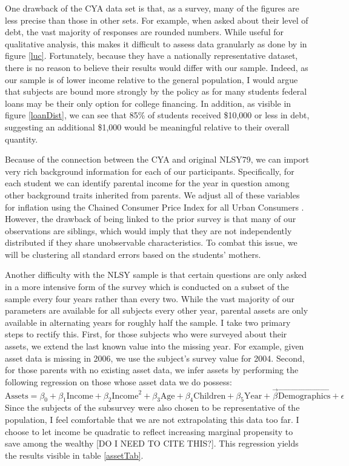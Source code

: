 \documentclass{article}
\begin{document}
	One drawback of the CYA data set is that, as a survey, many of the figures are less precise than those in other sets. For example, when asked about their level of debt, the vast majority of responses are rounded numbers. While useful for qualitative analysis, this makes it difficult to assess data granularly as done by \textcite{lucca2018} in figure \ref{luc}. Fortunately, because they have a nationally representative dataset, there is no reason to believe their results would differ with our sample. Indeed, as our sample is of lower income relative to the general population, I would argue that subjects are bound more strongly by the policy as for many students federal loans may be their only option for college financing. In addition, as visible in figure \ref{loanDist}, we can see that 85\% of students received \$10,000 or less in debt, suggesting an additional \$1,000 would be meaningful relative to their overall quantity. 
	
	Because of the connection between the CYA and original NLSY79, we can import very rich background information for each of our participants. Specifically, for each student we can identify parental income for the year in question among other background traits inherited from parents. We adjust all of these variables for inflation using the Chained Consumer Price Index for all Urban Consumers \parencite{bls2019}. However, the drawback of being linked to the prior survey is that many of our observations are siblings, which would imply that they are not independently distributed if they share unobservable characteristics. To combat this issue, we will be clustering all standard errors based on the students' mothers. 
	
	Another difficulty with the NLSY sample is that certain questions are only asked in a more intensive form of the survey which is conducted on a subset of the sample every four years rather than every two. While the vast majority of our parameters are available for all subjects every other year, parental assets are only available in alternating years for roughly half the sample. I take two primary steps to rectify this. First, for those subjects who were surveyed about their assets, we extend the last known value into the missing year. For example, given asset data is missing in 2006, we use the subject's survey value for 2004. Second, for those parents with no existing asset data, we infer assets by performing the following regression on those whose asset data we do possess: $$\mbox{Assets} = \beta_0 + \beta_1 \mbox{Income} + \beta_2 \mbox{Income}^2 + \beta_3 \mbox{Age} + \beta_4 \mbox{Children} + \beta_5 \mbox{Year} + \vec{\beta} \vec{\mbox{Demographics}} + \epsilon$$ Since the subjects of the subsurvey were also chosen to be representative of the population, I feel comfortable that we are not extrapolating this data too far. I choose to let income be quadratic to reflect increasing marginal propensity to save among the wealthy [DO I NEED TO CITE THIS?]. This regression yields the results visible in table \ref{assetTab}.
	
\end{document}
